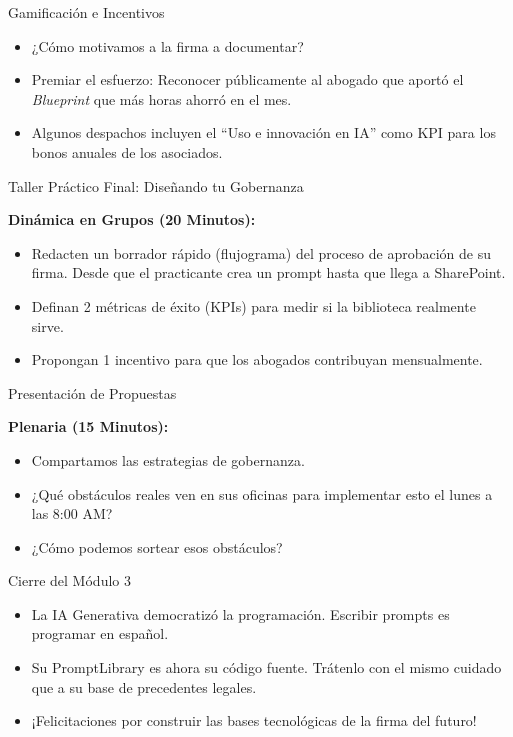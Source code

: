 \documentclass[aspectratio=169]{beamer}
\begin{document}
\begin{frame}{Gamificación e Incentivos}

\begin{itemize}
  \item ¿Cómo motivamos a la firma a documentar?
  \item Premiar el esfuerzo: Reconocer públicamente al abogado que aportó el \textit{Blueprint} que más horas ahorró en el mes.
  \item Algunos despachos incluyen el ``Uso e innovación en IA'' como KPI para los bonos anuales de los asociados.
\end{itemize}
\end{frame}

\begin{frame}{Taller Práctico Final: Diseñando tu Gobernanza}

\textbf{Dinámica en Grupos (20 Minutos):}
\begin{itemize}
  \item Redacten un borrador rápido (flujograma) del proceso de aprobación de su firma. Desde que el practicante crea un prompt hasta que llega a SharePoint.
  \item Definan 2 métricas de éxito (KPIs) para medir si la biblioteca realmente sirve.
  \item Propongan 1 incentivo para que los abogados contribuyan mensualmente.
\end{itemize}
\end{frame}

\begin{frame}{Presentación de Propuestas}

\textbf{Plenaria (15 Minutos):}
\begin{itemize}
  \item Compartamos las estrategias de gobernanza.
  \item ¿Qué obstáculos reales ven en sus oficinas para implementar esto el lunes a las 8:00 AM?
  \item ¿Cómo podemos sortear esos obstáculos?
\end{itemize}
\end{frame}

\begin{frame}{Cierre del Módulo 3}

\begin{itemize}
  \item La IA Generativa democratizó la programación. Escribir prompts es programar en español.
  \item Su PromptLibrary es ahora su código fuente. Trátenlo con el mismo cuidado que a su base de precedentes legales.
  \item ¡Felicitaciones por construir las bases tecnológicas de la firma del futuro!
\end{itemize}
\end{frame}
\end{document}
